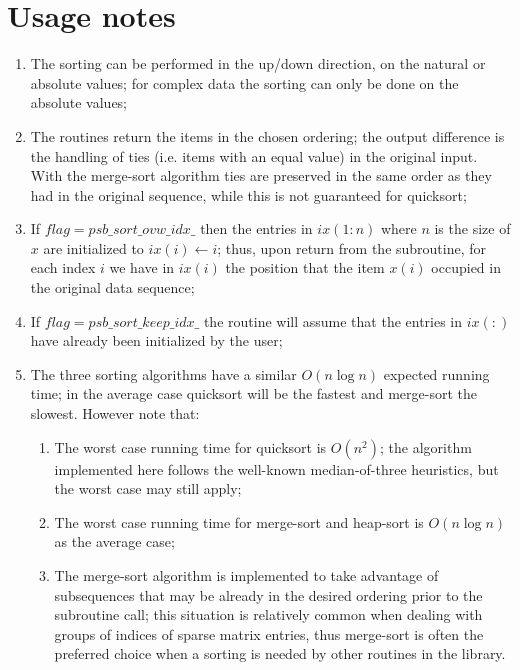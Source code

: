 \section*{Usage notes}
\begin{enumerate}
\item The sorting can be performed in the up/down direction, on the
  natural or absolute values; for  complex data the sorting can only
  be done on the absolute values; 
\item The routines return the items in the chosen ordering; the
  output difference is the handling of  ties (i.e. items with an
  equal   value) in the original input. With the merge-sort algorithm
  ties are   preserved in the same order as they had in the original
  sequence,  while this is not guaranteed for quicksort;
\item If $flag = psb\_sort\_ovw\_idx\_$ then the entries in $ix(1:n)$
  where $n$ is the size of $x$ are initialized to $ix(i) \leftarrow
  i$; thus, upon return from the subroutine, for each
  index $i$ we have in $ix(i)$ the position that the item $x(i)$
  occupied in the original data sequence;
\item If $flag = psb\_sort\_keep\_idx\_$  the routine will assume that
  the entries in $ix(:)$ have already been initialized by the user;
\item The three sorting algorithms have a similar $O(n \log n)$ expected
  running time; in the average case quicksort will be the
  fastest and merge-sort the slowest. However note that:
\begin{enumerate}
\item The worst case running time for quicksort is $O(n^2)$; the algorithm
  implemented here follows the well-known median-of-three heuristics,
  but the worst case may still apply;
\item The worst case running time for merge-sort and heap-sort is
  $O(n\log n)$  as the average case;
\item The merge-sort algorithm is implemented to take advantage of 
  subsequences that may be already in the desired ordering prior to
  the subroutine call; this situation is relatively common when
  dealing with groups of indices of sparse matrix entries, thus
  merge-sort is often the preferred  choice when a sorting is needed
  by other routines in the library. 
\end{enumerate}
\end{enumerate}



